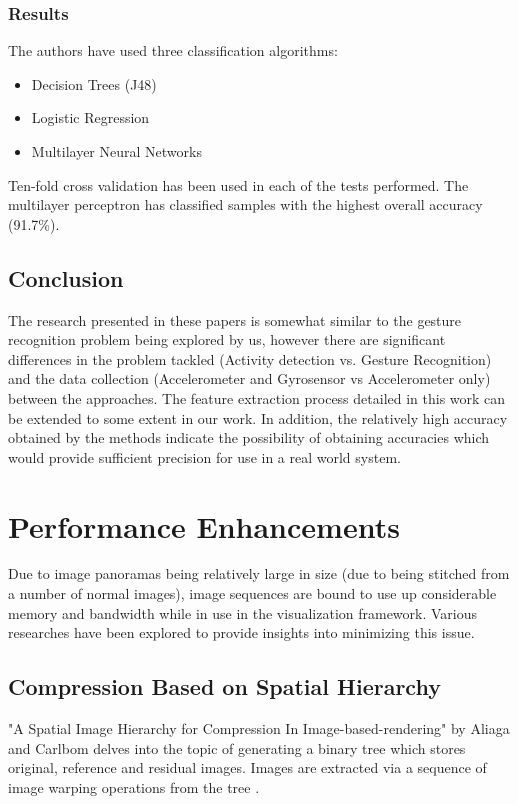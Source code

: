 \subsubsection{Results}
The authors have used three classification algorithms:
\begin{itemize}
\item{Decision Trees (J48)}
\item{Logistic Regression}
\item{Multilayer Neural Networks}
\end{itemize}

Ten-fold cross validation has been used in each of the tests performed. The multilayer perceptron has classified samples with the highest overall accuracy (91.7\%).

\subsection{Conclusion}
The research presented in these papers is somewhat similar to the gesture recognition problem being explored by us, however there are significant differences in the problem tackled (Activity detection vs. Gesture Recognition) and the data collection (Accelerometer and Gyrosensor vs Accelerometer only) between the approaches. The feature extraction process detailed in this work can be extended to some extent in our work. In addition, the relatively high accuracy obtained by the methods indicate the possibility of obtaining accuracies which would provide sufficient precision for use in a real world system.

\section{Performance Enhancements}
Due to image panoramas being relatively large in size (due to being stitched from a number of normal images), image sequences are bound to use up considerable memory and bandwidth while in use in the visualization framework. Various researches have been explored to provide insights into minimizing this issue. 

\subsection{Compression Based on Spatial Hierarchy}
"A Spatial Image Hierarchy for Compression In Image-based-rendering" by Aliaga and Carlbom delves into the topic of generating a binary tree which stores original, reference and residual images. Images are extracted via a sequence of image warping operations from the tree \cite{Aliaga05}.

